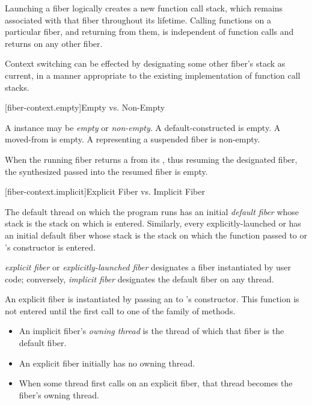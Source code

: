 Launching a fiber logically creates a new function call stack, which remains
associated with that fiber throughout its lifetime. Calling functions on a
particular fiber, and returning from them, is independent of function calls
and returns on any other fiber.

Context switching can be effected by designating some other fiber's stack as
current, in a manner appropriate to the existing implementation of function call stacks.

[fiber-context.empty]{Empty vs. Non-Empty}

A \fiber instance may be \emph{empty} or \emph{non-empty}. A
default-constructed \fiber is empty. A moved-from \fiber is empty. A \fiber
representing a suspended fiber is non-empty.

When the running fiber returns a \fiber from its \entryfn, thus resuming the
designated fiber, the synthesized \fiber passed into the resumed fiber is
empty.

[fiber-context.implicit]{Explicit Fiber vs. Implicit Fiber}

The default thread on which the program runs \main has an
initial \emph{default fiber} whose stack is the stack on which \main is
entered.  Similarly, every explicitly-launched
 or  has an initial default fiber whose
stack is the stack on which the function passed to  or
's constructor is entered.

\emph{explicit fiber} or \emph{explicitly-launched fiber}
designates a fiber instantiated by user code; conversely, \emph{implicit fiber}
designates the default fiber on any thread.

An explicit fiber is instantiated by passing an \emph{\entryfn} to \fiber's
constructor. This function is not entered until the first call to one of
the  family of methods.

\begin{itemize}
    \item An implicit fiber's \emph{owning thread} is the thread of which that
          fiber is the default fiber.
    \item An explicit fiber initially has no owning thread.
    \item When some thread first calls \anyresume on an explicit fiber, that
          thread becomes the fiber's owning thread.
\end{itemize}

